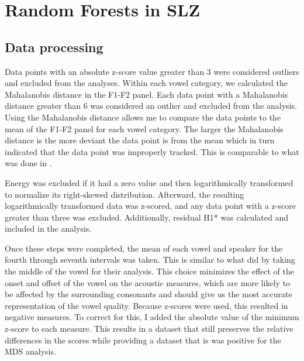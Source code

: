 \section{Random Forests in SLZ} \label{sec:bagging_slz}
\subsection{Data processing} \label{sec:bagging:processing}
Data points with an absolute z-score value greater than 3 were considered outliers and excluded from the analyses. Within each vowel category, we calculated the Mahalanobis distance in the F1-F2 panel. Each data point with a Mahalanobis distance greater than 6 was considered an outlier and excluded from the analysis. Using the Mahalanobis distance allows me to compare the data points to the mean of the F1-F2 panel for each vowel category. The larger the Mahalanobis distance is the more deviant the data point is from the mean which in turn indicated that the data point was improperly tracked. This is comparable to what was done in \citet{seyfarthPlosiveVoicingAcoustics2018,chaiCheckedSyllablesChecked2022,garellekPhoneticsWhiteHmong2023}.  

Energy was excluded if it had a zero value and then logarithmically transformed to normalize its right-skewed distribution. Afterward, the resulting logarithmically transformed data was z-scored, and any data point with a z-score greater than three was excluded. Additionally, residual H1* was calculated and included in the analysis.

Once these steps were completed, the mean of each vowel and speaker for the fourth through seventh intervals was taken. This is similar to what \citet{keatingCrosslanguageAcousticSpace2023} did by taking the middle of the vowel for their analysis. This choice minimizes the effect of the onset and offset of the vowel on the acoustic measures, which are more likely to be affected by the surrounding consonants and should give us the most accurate representation of the vowel quality. Because z-scores were used, this resulted in negative measures. To correct for this, I added the absolute value of the minimum z-score to each measure. This results in a dataset that still preserves the relative differences in the scores while providing a dataset that is was positive for the MDS analysis.

